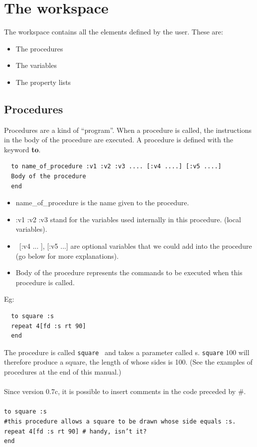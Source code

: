 \section{The workspace}
The workspace contains all the elements defined by the user. These are:
\begin{itemize}
\item The procedures
\item The variables
\item The property lists
\end{itemize}
 
\subsection{Procedures}
Procedures are a kind of {}``program''. When a procedure is called,
the instructions in the body of the procedure are executed. A procedure
is defined with the keyword \textbf{to}.\\

   
\begin{verbatim}
  to name_of_procedure :v1 :v2 :v3 .... [:v4 ....] [:v5 ....]
  Body of the procedure
  end
\end{verbatim}

\noindent \begin{itemize}
\item name\_of\_procedure is the name given to the procedure.
\item  :v1 :v2 :v3 stand for the variables used internally in this procedure. (local variables).
\item \ [:v4 ... ], [:v5 ...] are optional variables that we could add into the procedure (go below for more explanations).
 \item   Body of the procedure represents the commands to be executed when this procedure is called.\\
\end{itemize}
\noindent 
Eg: \begin{verbatim}
  to square :s
  repeat 4[fd :s rt 90]
  end
\end{verbatim}

The procedure is called \texttt{square} \  and takes a parameter
called s. \texttt{square} 100 will therefore produce a square, the
length of whose sides is 100. (See the examples of procedures at the
end of this manual.)\\
\\
 Since version 0.7c, it is possible to insert comments in the code
preceded by \#.\\
\\
 \texttt{to square :s}~\\
 \texttt{\#this procedure allows a square to be drawn whose side equals
:s.}~\\
 \texttt{repeat 4{[}fd :s rt 90{]} \# handy, isn't it?}~\\
 \texttt{end}~\\

